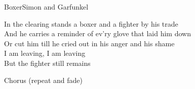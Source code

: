 \begin{song}{Boxer}{Simon and Garfunkel}
\begin{guitar}
In the clearing stands a boxer and a fighter by his trade\\
And he carries a reminder of ev'ry glove that laid him down\\
Or cut him till he cried out in his anger and his shame\\
I am leaving, I am leaving\\
But the fighter still remains\\
\end{guitar}

\begin{guitar}
Chorus (repeat and fade)\\
\end{guitar}
\end{song}
